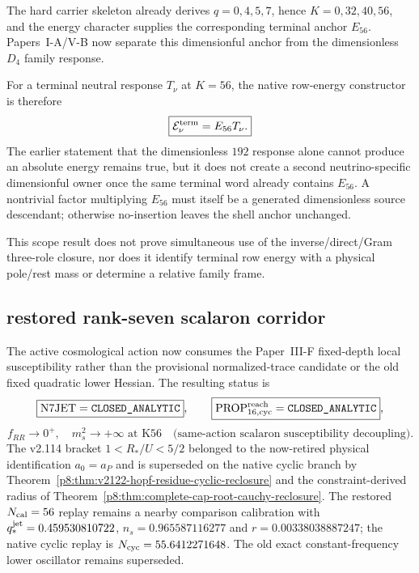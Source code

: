 \documentclass[12pt,a4paper]{article}
\begin{document}
The hard carrier skeleton already derives \(q=0,4,5,7\), hence
\(K=0,32,40,56\), and the energy character supplies the corresponding
terminal anchor \(E_{56}\).  Papers~I-A/V-B now separate this dimensionful
anchor from the dimensionless \(D_4\) family response.

For a terminal neutral response \(T_\nu\) at \(K=56\), the native row-energy
constructor is therefore
\[
 \boxed{\mathcal E_\nu^{\rm term}=E_{56}T_\nu.}
\]
The earlier statement that the dimensionless \(192\) response alone cannot
produce an absolute energy remains true, but it does not create a second
neutrino-specific dimensionful owner once the same terminal word already
contains \(E_{56}\).  A nontrivial factor multiplying \(E_{56}\) must itself
be a generated dimensionless source descendant; otherwise no-insertion leaves
the shell anchor unchanged.

This scope result does not prove simultaneous use of the inverse/direct/Gram
three-role closure, nor does it identify terminal row energy with a physical
pole/rest mass or determine a relative family frame.


\subsection*{restored rank-seven scalaron corridor}
\label{p8:sec:v2114-n7-restored-corridor}
The active cosmological action now consumes the Paper~III-F fixed-depth local
susceptibility rather than the provisional normalized-trace candidate or the
old fixed quadratic lower Hessian.  The resulting status is
\[
 \boxed{\mathrm{N7JET}=\texttt{CLOSED\_ANALYTIC}},\qquad
 \boxed{\mathrm{PROP}^{\rm reach}_{16,\rm cyc}=\texttt{CLOSED\_ANALYTIC}},
\]
\[
 \boxed{f_{RR}\to0^+,\quad m_s^2\to+\infty\text{ at K56}}
 \quad\text{(same-action scalaron susceptibility decoupling).}
\]
The v2.114 bracket $1<R_*/U<5/2$ belonged to the now-retired physical
identification $a_0=a_P$ and is superseded on the native cyclic branch by
Theorem~\ref{p8:thm:v2122-hopf-residue-cyclic-reclosure} and the
constraint-derived radius of
Theorem~\ref{p8:thm:complete-cap-root-cauchy-reclosure}.  The restored
$N_{\rm cal}=56$ replay remains a nearby comparison calibration with
$q_*^{\rm jet}=0.459530810722$, $n_s=0.965587116277$ and
$r=0.00338038887247$; the native cyclic replay is
$N_{\rm cyc}=55.6412271648$.  The old exact constant-frequency lower
oscillator remains superseded.
\end{document}

